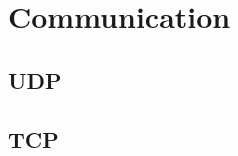 \documentclass[a4paper]{article}
\title{\docTitle}
\author{Moritz}
\date{\today}
\begin{document}
\maketitle
\tableofcontents


\section{Communication}

\subsection{UDP}

\subsection{TCP}
\end{document}
